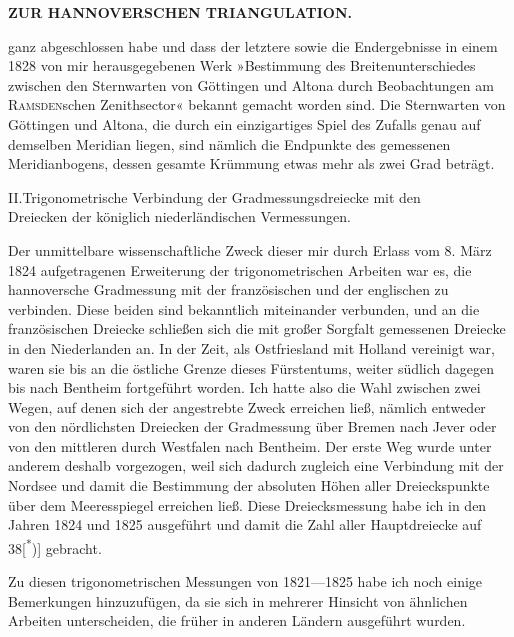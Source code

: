 \par\clearpage
\noindent\null\hfill{\small\textbf{ZUR HANNOVERSCHEN TRIANGULATION.}}\hfill{}\par\medskip

\noindent ganz abgeschlossen habe und dass der letztere sowie die Endergebnisse in einem 1828 von mir herausgegebenen Werk »Bestimmung des Breitenunterschiedes zwischen den Sternwarten von Göttingen und Altona durch Beobachtungen am \textsc{Ramsden}schen Zenithsector« bekannt gemacht worden sind. Die Sternwarten von Göttingen und Altona, die durch ein einzigartiges Spiel des Zufalls genau auf demselben Meridian liegen, sind nämlich die Endpunkte des gemessenen Meridianbogens, dessen gesamte Krümmung etwas mehr als zwei Grad beträgt.

\begin{center}
II.\quad Trigonometrische Verbindung der Gradmessungsdreiecke mit den\\
Dreiecken der königlich niederländischen Vermessungen.
\end{center}

\par\noindent\hspace*{\parindent}Der unmittelbare wissenschaftliche Zweck dieser mir durch Erlass vom 8. März 1824 aufgetragenen Erweiterung der trigonometrischen Arbeiten war es, die hannoversche Gradmessung mit der französischen und der englischen zu verbinden. Diese beiden sind bekanntlich miteinander verbunden, und an die französischen Dreiecke schließen sich die mit großer Sorgfalt gemessenen Dreiecke in den Niederlanden an. In der Zeit, als Ostfriesland mit Holland vereinigt war, waren sie bis an die östliche Grenze dieses Fürstentums, weiter südlich dagegen bis nach Bentheim fortgeführt worden. Ich hatte also die Wahl zwischen zwei Wegen, auf denen sich der angestrebte Zweck erreichen ließ, nämlich entweder von den nördlichsten Dreiecken der Gradmessung über Bremen nach Jever oder von den mittleren durch Westfalen nach Bentheim. Der erste Weg wurde unter anderem deshalb vorgezogen, weil sich dadurch zugleich eine Verbindung mit der Nordsee und damit die Bestimmung der absoluten Höhen aller Dreieckspunkte über dem Meeresspiegel erreichen ließ. Diese Dreiecksmessung habe ich in den Jahren 1824 und 1825 ausgeführt und damit die Zahl aller Hauptdreiecke auf 38[\textsuperscript{*})] gebracht.

\par\medskip
\par\noindent\hspace*{\parindent}Zu diesen trigonometrischen Messungen von 1821---1825 habe ich noch einige Bemerkungen hinzuzufügen, da sie sich in mehrerer Hinsicht von ähnlichen Arbeiten unterscheiden, die früher in anderen Ländern ausgeführt wurden.

